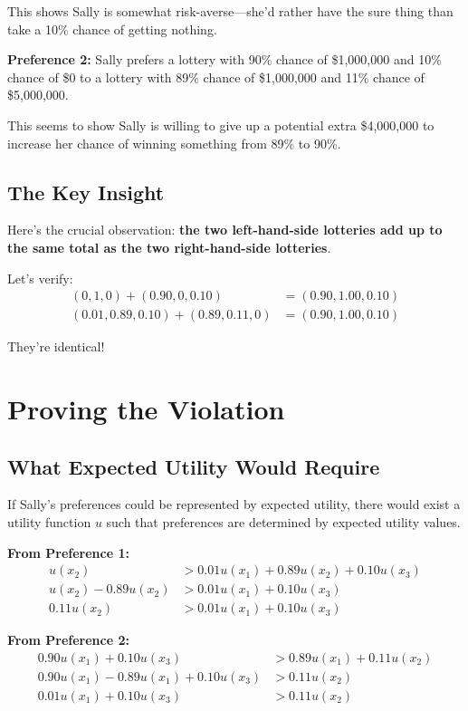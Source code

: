 \documentclass[12pt]{article}
\begin{document}
This shows Sally is somewhat risk-averse—she'd rather have the sure thing than take a 10\% chance of getting nothing.

\textbf{Preference 2:} Sally prefers a lottery with 90\% chance of \$1,000,000 and 10\% chance of \$0 to a lottery with 89\% chance of \$1,000,000 and 11\% chance of \$5,000,000.

This seems to show Sally is willing to give up a potential extra \$4,000,000 to increase her chance of winning something from 89\% to 90\%.

\subsection{The Key Insight}

Here's the crucial observation: \textbf{the two left-hand-side lotteries add up to the same total as the two right-hand-side lotteries}.

Let's verify:
\begin{align*}
(0, 1, 0) + (0.90, 0, 0.10) &= (0.90, 1.00, 0.10)\\
(0.01, 0.89, 0.10) + (0.89, 0.11, 0) &= (0.90, 1.00, 0.10)
\end{align*}

They're identical!

\section{Proving the Violation}

\subsection{What Expected Utility Would Require}

If Sally's preferences could be represented by expected utility, there would exist a utility function $u$ such that preferences are determined by expected utility values.

\textbf{From Preference 1:}
\begin{align*}
u(x_2) &> 0.01u(x_1) + 0.89u(x_2) + 0.10u(x_3)\\
u(x_2) - 0.89u(x_2) &> 0.01u(x_1) + 0.10u(x_3)\\
0.11u(x_2) &> 0.01u(x_1) + 0.10u(x_3)
\end{align*}

\textbf{From Preference 2:}
\begin{align*}
0.90u(x_1) + 0.10u(x_3) &> 0.89u(x_1) + 0.11u(x_2)\\
0.90u(x_1) - 0.89u(x_1) + 0.10u(x_3) &> 0.11u(x_2)\\
0.01u(x_1) + 0.10u(x_3) &> 0.11u(x_2)
\end{align*}
\end{document}
